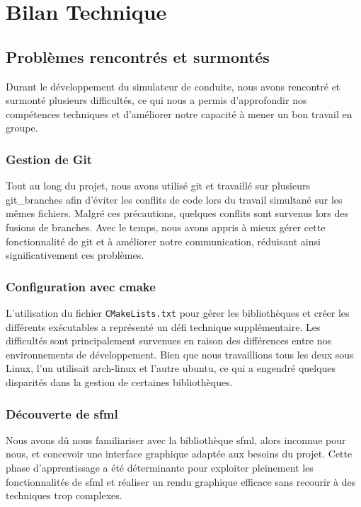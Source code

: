 \section{Bilan Technique}\label{sec:bilan-technique}

\subsection{Problèmes rencontrés et surmontés}\label{subsec:problemes-rencontres-et-surmontes}
Durant le développement du simulateur de conduite, nous avons rencontré et surmonté plusieurs difficultés, ce qui nous a permis d'approfondir nos compétences techniques et d'améliorer notre capacité à mener un bon travail en groupe.

\subsubsection{Gestion de Git}\label{subsubsec:git}
Tout au long du projet, nous avons utilisé \gls{git} et travaillé sur plusieurs \gls{git_branches} afin d'éviter les conflits de code lors du travail simultané sur les mêmes fichiers.
Malgré ces précautions, quelques conflits sont survenus lors des fusions de branches.
Avec le temps, nous avons appris à mieux gérer cette fonctionnalité de \gls{git} et à améliorer notre communication, réduisant ainsi significativement ces problèmes.

\subsubsection{Configuration avec \gls{cmake}}\label{subsubsec:cmake}
L'utilisation du fichier \texttt{CMakeLists.txt} pour gérer les bibliothèques et créer les différents exécutables a représenté un défi technique supplémentaire.
Les difficultés sont principalement survenues en raison des différences entre nos environnements de développement.
Bien que nous travaillions tous les deux sous Linux, l'un utilisait \gls{arch-linux} et l'autre \gls{ubuntu}, ce qui a engendré quelques disparités dans la gestion de certaines bibliothèques.

\subsubsection{Découverte de \gls{sfml}}\label{subsubsec:sfml}
Nous avons dû nous familiariser avec la bibliothèque \gls{sfml}, alors inconnue pour nous, et concevoir une interface graphique adaptée aux besoins du projet.
Cette phase d'apprentissage a été déterminante pour exploiter pleinement les fonctionnalités de \gls{sfml} et réaliser un rendu graphique efficace sans recourir à des techniques trop complexes.

